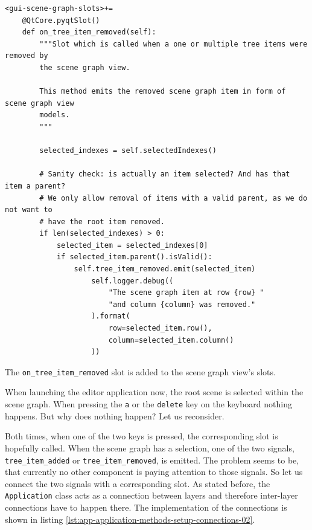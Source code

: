 \documentclass[10pt, openright, notitlepage]{scrreprt}
\begin{document}
\begin{listing}[H]
\begin{verbatim}
<gui-scene-graph-slots>+=
    @QtCore.pyqtSlot()
    def on_tree_item_removed(self):
        """Slot which is called when a one or multiple tree items were removed by
        the scene graph view.
    
        This method emits the removed scene graph item in form of scene graph view
        models.
        """
    
        selected_indexes = self.selectedIndexes()
    
        # Sanity check: is actually an item selected? And has that item a parent?
        # We only allow removal of items with a valid parent, as we do not want to
        # have the root item removed.
        if len(selected_indexes) > 0:
            selected_item = selected_indexes[0]
            if selected_item.parent().isValid():
                self.tree_item_removed.emit(selected_item)
                    self.logger.debug((
                        "The scene graph item at row {row} "
                        "and column {column} was removed."
                    ).format(
                        row=selected_item.row(),
                        column=selected_item.column()
                    ))
\end{verbatim}
\caption{\label{lst:gui-scene-graph-slots-on-tree-item-removed}
The \texttt{on\_tree\_item\_removed} slot is added to the scene graph view's slots.}
\end{listing}

When launching the editor application now, the root scene is selected within the
scene graph. When pressing the \texttt{a} or the \texttt{delete} key on the keyboard nothing
happens. But why does nothing happen? Let us reconsider.

Both times, when one of the two keys is pressed, the corresponding slot is
hopefully called. When the scene graph has a selection, one of the two signals,
\texttt{tree\_item\_added} or \texttt{tree\_item\_removed}, is emitted.
The problem seems to be, that currently no other component is paying attention
to those signals. So let us connect the two signals with a corresponding slot.
As stated before, the \texttt{Application} class acts as a connection between
layers and therefore inter-layer connections have to happen there. The
implementation of the connections is shown in listing
\ref{lst:app-application-methods-setup-connections-02}.
\end{document}
